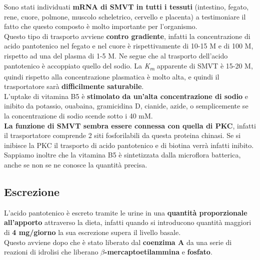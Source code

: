 \documentclass[a4paper, 12pt]{article}
\begin{document}
Sono stati individuati \textbf{mRNA di SMVT in tutti i tessuti} (intestino, fegato, rene, cuore, polmone, muscolo scheletrico, cervello e placenta) a testimoniare il fatto che questo composto è molto importante per l’organismo.\\
Questo tipo di trasporto avviene \textbf{contro gradiente}, infatti la concentrazione di acido pantotenico nel fegato e nel cuore è rispettivamente di 10-15 {\textmu}M e di 100 {\textmu}M, rispetto ad una del plasma di 1-5 {\textmu}M. Ne segue che al trasporto dell'acido pantotenico è accoppiato quello del sodio. La \textit{K\textsubscript{m}} apparente di SMVT è 15-20 {\textmu}M, quindi rispetto alla concentrazione plasmatica è molto alta, e quindi il trasportatore sarà \textbf{difficilmente saturabile}.\\
L’uptake di vitamina B5 è \textbf{stimolato da un’alta concentrazione di sodio} e inibito da potassio, ouabaina, gramicidina D, cianide, azide, o semplicemente se la concentrazione di sodio scende sotto i 40 mM.\\
\textbf{La funzione di SMVT sembra essere connessa con quella di PKC}, infatti il trasportatore comprende 2 siti fosforilabili da questa proteina chinasi. Se si inibisce la PKC il trasporto di acido pantotenico e di biotina verrà infatti inibito.\\
Sappiamo inoltre che la vitamina B5 è sintetizzata dalla microflora batterica, anche se non se ne conosce la quantità precisa.

\subsection{Escrezione}
L’acido pantotenico è escreto tramite le urine in una \textbf{quantità proporzionale all’apporto} attraverso la dieta, infatti quando si introducono quantità maggiori di \textbf{4 mg/giorno} la sua escrezione supera il livello basale.\\
Questo avviene dopo che è stato liberato dal \textbf{coenzima A} da una serie di reazioni di idrolisi che liberano \textbf{$\beta$-mercaptoetilammina} e \textbf{fosfato}.
\end{document}
